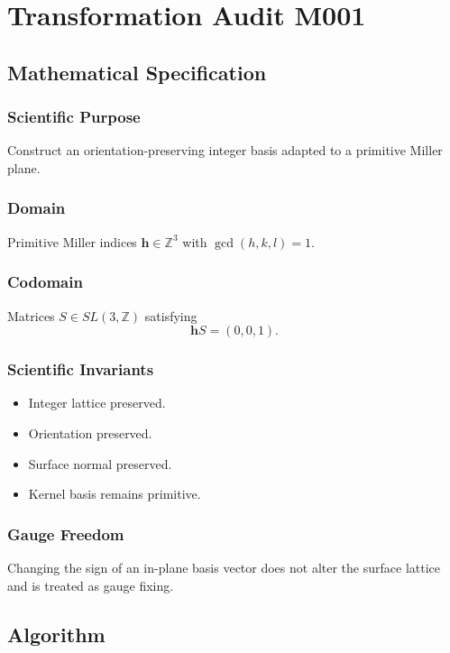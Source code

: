 
\chapter{Transformation Audit M001}
\label{chap:audit-m001}

\section{Mathematical Specification}

\subsection*{Scientific Purpose}
Construct an orientation-preserving integer basis adapted to a primitive
Miller plane.

\subsection*{Domain}
Primitive Miller indices $\mathbf h\in\mathbb Z^3$ with
$\gcd(h,k,l)=1$.

\subsection*{Codomain}
Matrices $S\in SL(3,\mathbb Z)$ satisfying
\[
\mathbf hS=(0,0,1).
\]

\subsection*{Scientific Invariants}
\begin{itemize}
\item Integer lattice preserved.
\item Orientation preserved.
\item Surface normal preserved.
\item Kernel basis remains primitive.
\end{itemize}

\subsection*{Gauge Freedom}
Changing the sign of an in-plane basis vector does not alter the surface
lattice and is treated as gauge fixing.

\section{Algorithm}

